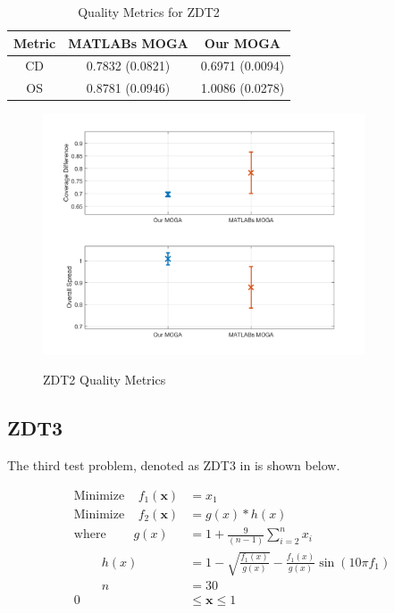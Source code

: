 \documentclass{article}
\begin{document}
\begin{table}[H]
\caption{Quality Metrics for ZDT2} 
\centering 
\begin{tabular}{|c|c|c|} 
\hline\hline  
Metric & MATLABs MOGA & Our MOGA \\ \hline
CD & 0.7832  (0.0821) & 0.6971  (0.0094) \\ \hline
OS &  0.8781 (0.0946) & 1.0086 (0.0278)  \\ \hline
\end{tabular}
\label{tab:ZDT2} 
\end{table}
\begin{figure}[H]
  \caption{ZDT2 Quality Metrics}
  \centering
  \includegraphics[width=0.85\textwidth]{ZDT2_QM.png}  
  \label{fig:ZDT2_QM}
\end{figure}
\newpage
\newpage
\newpage
\goodbreak
\newpage
    
\goodbreak

\newpage
\goodbreak
\subsection{ZDT3} 
The third test problem, denoted as ZDT3 in \cite{deb2001multi} is shown below. 


\begin{align*}
\textrm{Minimize} ~~~~~ f_1(\textbf{x}) &= x_1 \\
\textrm{Minimize} ~~~~~ f_2(\textbf{x}) &= g(x)*h(x) \\
\textrm{where} ~~~~~~~~~~ g(x) &= 1+\frac{9}{(n-1)}\sum_{i=2}^{n}x_i \\
~~~~~~~~~~ h(x) &= 1- \sqrt{\frac{f_1(x)}{g(x)}}- \frac{f_1(x)}{g(x)}\sin(10\pi f_1) \\
~~~~~~~~~~ n &= 30 \\
0 &\leq  \textbf{x}  \leq 1 \\
\end{align*}
\end{document}
